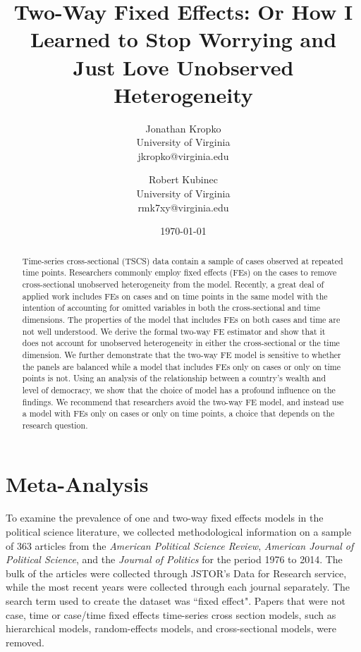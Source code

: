 \documentclass{article}[12pt]
\begin{document}
\title{Two-Way Fixed Effects: Or How I Learned to Stop Worrying and Just Love Unobserved Heterogeneity}
\date{\today}
\author{Jonathan Kropko\\ University of Virginia \\ jkropko@virginia.edu \and Robert Kubinec \\University of Virginia\\rmk7xy@virginia.edu}
\maketitle
\begin{abstract}
\noindent Time-series cross-sectional (TSCS) data contain a sample of cases observed at repeated time points.  Researchers commonly employ fixed effects (FEs) on the cases to remove cross-sectional unobserved heterogeneity from the model.  Recently, a great deal of applied work includes FEs on cases and on time points in the same model with the intention of accounting for omitted variables in both the cross-sectional and time dimensions.  The properties of the model that includes FEs on both cases and time are not well understood.  We derive the formal two-way FE estimator and show that it does not account for unobserved heterogeneity in either the cross-sectional or the time dimension.  We further demonstrate that the two-way FE model is sensitive to whether the panels are balanced while a model that includes FEs only on cases or only on time points is not.  Using an analysis of the relationship between a country's wealth and level of democracy, we show that the choice of model has a profound influence on the findings.  We recommend that researchers avoid the two-way FE model, and instead use a model with FEs only on cases or only on time points, a choice that depends on the research question. 
\end{abstract}

\newpage

\section{Meta-Analysis}

To examine the prevalence of one and two-way fixed effects models in the political science literature, we collected methodological information on a sample of 363 articles from the \emph{American Political Science Review}, \emph{American Journal of Political Science}, and the \emph{Journal of Politics} for the period 1976 to 2014. The bulk of the articles were collected through JSTOR's Data for Research service, while the most recent years were collected through each journal separately. The search term used to create the dataset was ``fixed effect". Papers that were not case, time or case/time fixed effects time-series cross section models, such as hierarchical models, random-effects models, and cross-sectional models, were removed.
\end{document}
